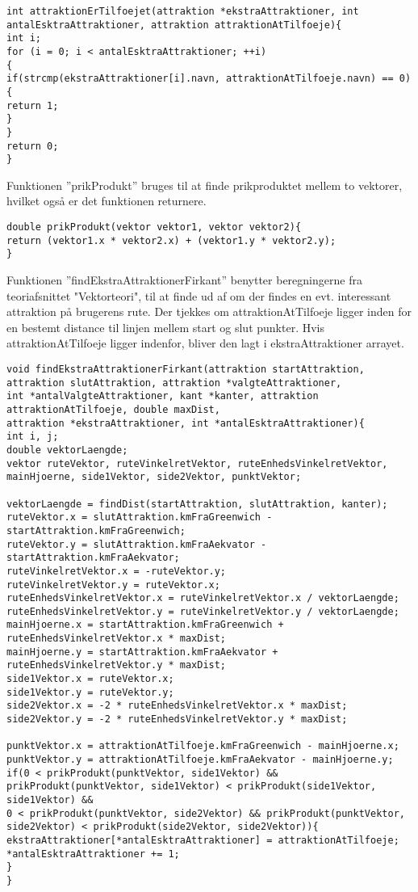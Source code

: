 \begin{lstlisting}
int attraktionErTilfoejet(attraktion *ekstraAttraktioner, int antalEsktraAttraktioner, attraktion attraktionAtTilfoeje){
int i;
for (i = 0; i < antalEsktraAttraktioner; ++i)
{
if(strcmp(ekstraAttraktioner[i].navn, attraktionAtTilfoeje.navn) == 0){
return 1;
}
}
return 0;
}
\end{lstlisting}

Funktionen ”prikProdukt” bruges til at finde prikproduktet mellem to vektorer, hvilket også er det funktionen returnere. \newline

\begin{lstlisting}
double prikProdukt(vektor vektor1, vektor vektor2){
return (vektor1.x * vektor2.x) + (vektor1.y * vektor2.y);
}
\end{lstlisting}

Funktionen ”findEkstraAttraktionerFirkant” benytter beregningerne fra teoriafsnittet "Vektorteori", til at finde ud af om der findes en evt. interessant attraktion på brugerens rute. Der tjekkes om attraktionAtTilfoeje ligger inden for en bestemt distance til linjen mellem start og slut punkter. Hvis attraktionAtTilfoeje ligger indenfor, bliver den lagt i ekstraAttraktioner arrayet. \newline

\begin{lstlisting}
void findEkstraAttraktionerFirkant(attraktion startAttraktion, attraktion slutAttraktion, attraktion *valgteAttraktioner, 
int *antalValgteAttraktioner, kant *kanter, attraktion attraktionAtTilfoeje, double maxDist, 
attraktion *ekstraAttraktioner, int *antalEsktraAttraktioner){
int i, j;
double vektorLaengde;
vektor ruteVektor, ruteVinkelretVektor, ruteEnhedsVinkelretVektor, mainHjoerne, side1Vektor, side2Vektor, punktVektor;

vektorLaengde = findDist(startAttraktion, slutAttraktion, kanter);
ruteVektor.x = slutAttraktion.kmFraGreenwich - startAttraktion.kmFraGreenwich;
ruteVektor.y = slutAttraktion.kmFraAekvator - startAttraktion.kmFraAekvator;
ruteVinkelretVektor.x = -ruteVektor.y;
ruteVinkelretVektor.y = ruteVektor.x;
ruteEnhedsVinkelretVektor.x = ruteVinkelretVektor.x / vektorLaengde;
ruteEnhedsVinkelretVektor.y = ruteVinkelretVektor.y / vektorLaengde;
mainHjoerne.x = startAttraktion.kmFraGreenwich + ruteEnhedsVinkelretVektor.x * maxDist;
mainHjoerne.y = startAttraktion.kmFraAekvator + ruteEnhedsVinkelretVektor.y * maxDist;
side1Vektor.x = ruteVektor.x;
side1Vektor.y = ruteVektor.y;
side2Vektor.x = -2 * ruteEnhedsVinkelretVektor.x * maxDist;
side2Vektor.y = -2 * ruteEnhedsVinkelretVektor.y * maxDist;

punktVektor.x = attraktionAtTilfoeje.kmFraGreenwich - mainHjoerne.x;
punktVektor.y = attraktionAtTilfoeje.kmFraAekvator - mainHjoerne.y;
if(0 < prikProdukt(punktVektor, side1Vektor) && prikProdukt(punktVektor, side1Vektor) < prikProdukt(side1Vektor, side1Vektor) &&
0 < prikProdukt(punktVektor, side2Vektor) && prikProdukt(punktVektor, side2Vektor) < prikProdukt(side2Vektor, side2Vektor)){
ekstraAttraktioner[*antalEsktraAttraktioner] = attraktionAtTilfoeje;
*antalEsktraAttraktioner += 1;
}
}
\end{lstlisting}

